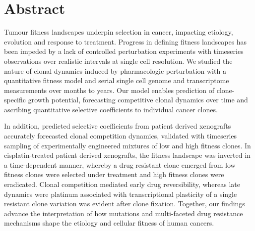 

\section*{Abstract}
Tumour fitness landscapes underpin selection in cancer, impacting etiology, evolution and response to treatment. Progress in defining fitness landscapes has been impeded by a lack of controlled perturbation experiments with timeseries observations over realistic intervals at single cell resolution.
We studied the nature of clonal dynamics induced by  pharmacologic perturbation with a quantitative fitness model and serial single cell genome and transcriptome measurements over months to years. 
Our model enables prediction of clone-specific growth potential, forecasting competitive clonal dynamics over time and ascribing  quantitative selective coefficients to individual cancer clones. 

In addition, predicted selective coefficients from patient derived xenografts accurately forecasted clonal competition dynamics, validated with timeseries sampling of experimentally engineered mixtures of low and high fitness clones.
In cisplatin-treated patient derived xenografts, the fitness landscape was inverted in a time-dependent manner, whereby a drug resistant clone emerged from low fitness clones were selected under treatment and high fitness clones were eradicated. 
Clonal competition mediated early drug reversibility, whereas late dynamics were platinum associated with transcriptional plasticity  of  a  single  resistant  clone variation was evident after clone fixation. 
Together, our findings advance the interpretation of how mutations and multi-faceted drug resistance mechanisms shape the etiology and cellular fitness of human cancers.


